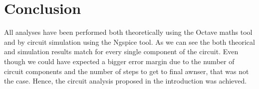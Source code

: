 \section{Conclusion}
\label{resan}
All analyses have been performed both theoretically using the Octave maths tool and by circuit simulation using the Ngspice tool.
As we can see the both theorical and simulation results match for every single component of the circuit. Even though we could have expected a bigger error margin due to the number of circuit components and the number of steps to get to final awnser, that was not the case. Hence, the circuit analysis proposed in the introduction was achieved.

